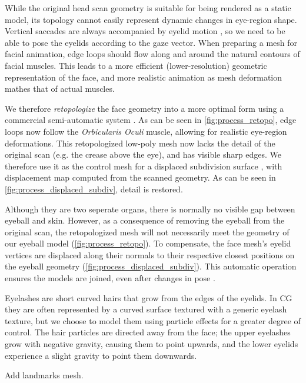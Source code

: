 While the original head scan geometry is suitable for being rendered as a static model, its topology cannot easily represent dynamic changes in eye-region shape. Vertical saccades are always accompanied by eyelid motion \cite{liversedge2011oxford}, so we need to be able to pose the eyelids according to the gaze vector. When preparing a mesh for facial animation, edge loops should flow along and around the natural contours of facial muscles. This leads to a more efficient (lower-resolution) geometric representation of the face, and more realistic animation as mesh deformation mathes that of actual muscles.

We therefore \emph{retopologize} the face geometry into a more optimal form using a commercial semi-automatic system \cite{ZRemesher}.  As can be seen in \autoref{fig:process_retopo}, edge loops now follow the \emph{Orbicularis Oculi} muscle, allowing for realistic eye-region deformations. This retopologized low-poly mesh now lacks the detail of the original scan (e.g. the crease above the eye), and has visible sharp edges. We therefore use it as the control mesh for a displaced subdivision surface \cite{lee2000displaced}, with displacement map computed from the scanned geometry. As can be seen in \autoref{fig:process_displaced_subdiv}, detail is restored.

Although they are two seperate organs, there is normally no visible gap between eyeball and skin. However, as a consequence of removing the eyeball from the original scan, the retopologized mesh will not necessarily meet the geometry of our eyeball model (\autoref{fig:process_retopo}). To compensate, the face mesh's eyelid vertices are displaced along their normals to their respective closest positions on the eyeball geometry (\autoref{fig:process_displaced_subdiv}). This automatic operation ensures the models are joined, even after changes in pose \cite{Shrinkwrap}.

Eyelashes are short curved hairs that grow from the edges of the eyelids. In CG they are often represented by a curved surface textured with a generic eyelash texture, but we choose to model them using particle effects for a greater degree of control. The hair particles are directed away from the face; the upper eyelashes grow with negative gravity, causing them to point upwards, and the lower eyelids experience a slight gravity to point them downwards.

Add landmarks mesh.

